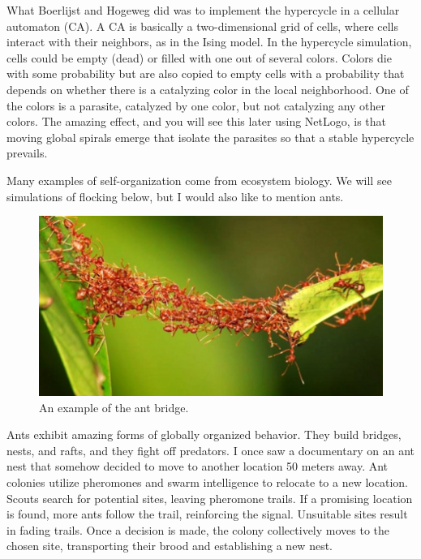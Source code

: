 \documentclass[
  a4paper,
  DIV=11,
  numbers=noendperiod]{scrreprt}
\begin{document}
What Boerlijst and Hogeweg did was to implement the hypercycle in a
cellular automaton (CA). A CA is basically a two-dimensional grid of
cells, where cells interact with their neighbors, as in the Ising model.
In the hypercycle simulation, cells could be empty (dead) or filled with
one out of several colors. Colors die with some probability but are also
copied to empty cells with a probability that depends on whether there
is a catalyzing color in the local neighborhood. One of the colors is a
parasite, catalyzed by one color, but not catalyzing any other colors.
The amazing effect, and you will see this later using NetLogo, is that
moving global spirals emerge that isolate the parasites so that a stable
hypercycle prevails.

Many examples of self-organization come from ecosystem biology. We will
see simulations of flocking below, but I would also like to mention
ants.

\begin{figure}

{\centering \includegraphics{media/ch5n/image2b.jpeg}

}

\caption{\label{fig-ch5n-img2-old-40}An example of the ant bridge.}

\end{figure}

Ants exhibit amazing forms of globally organized behavior. They build
bridges, nests, and rafts, and they fight off predators. I once saw a
documentary on an ant nest that somehow decided to move to another
location 50 meters away. Ant colonies utilize pheromones and swarm
intelligence to relocate to a new location. Scouts search for potential
sites, leaving pheromone trails. If a promising location is found, more
ants follow the trail, reinforcing the signal. Unsuitable sites result
in fading trails. Once a decision is made, the colony collectively moves
to the chosen site, transporting their brood and establishing a new
nest.
\end{document}
